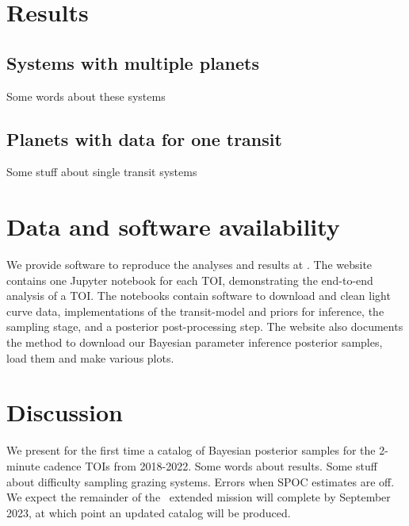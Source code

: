 \documentclass[linenumbers,floatfix,ApJL,twocolumn]{aastex631}
\begin{document}
%
%
%
%






\section{Results}\label{sec:results}

\subsection{Systems with multiple planets}
Some words about these systems

\subsection{Planets with data for one transit}
Some stuff about single transit systems 


\section{Data and software availability}\label{sec:data}
We provide software to reproduce the analyses and results at \atlasUrl. 
The website contains one Jupyter notebook for each TOI, demonstrating the end-to-end analysis of a TOI. 
The notebooks contain software to download and clean light curve data, implementations of the transit-model and priors for inference, the \pymc sampling stage, and a posterior post-processing step.
The website also documents the method to download our Bayesian parameter inference posterior samples, load them and make various plots.  

\section{Discussion}\label{sec:conclusion}
We present for the first time a catalog of Bayesian posterior samples for the 2-minute cadence TOIs from 2018-2022. 
Some words about results. 
Some stuff about difficulty sampling grazing systems.
Errors when SPOC estimates are off. 
We expect the remainder of the \tess\ extended mission will complete by September 2023, at which point an updated catalog will be produced.
\end{document}
